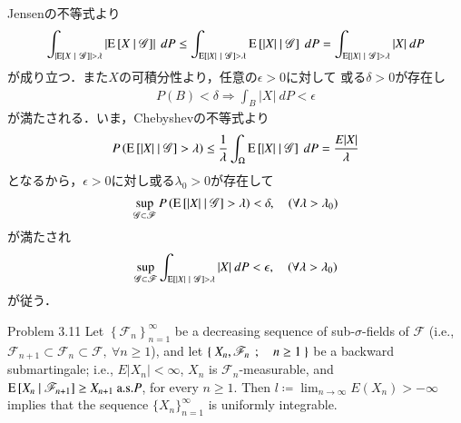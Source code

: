 	\begin{prf}
		Jensenの不等式より
		\begin{align}
			\int_{\left| \operatorname{E} \left[ X \ \middle|\ \mathscr{G} \right] \right| > \lambda} \left| \operatorname{E} \left[ X \ \middle|\ \mathscr{G} \right] \right|\ dP
			\leq \int_{\operatorname{E} \left[ |X| \ \middle|\ \mathscr{G} \right] > \lambda} \operatorname{E} \left[ |X| \ \middle|\ \mathscr{G} \right]\ dP
			= \int_{\operatorname{E} \left[ |X| \ \middle|\ \mathscr{G} \right] > \lambda} |X|\ dP
		\end{align}
		が成り立つ．また$X$の可積分性より，任意の$\epsilon > 0$に対して
		或る$\delta > 0$が存在し
		\begin{align}
			P(B) < \delta \Rightarrow \int_B |X|\ dP < \epsilon
		\end{align}
		が満たされる．いま，Chebyshevの不等式より
		\begin{align}
			P\left( \cexp{|X|}{\mathscr{G}} > \lambda \right)
			\leq \frac{1}{\lambda} \int_\Omega \cexp{|X|}{\mathscr{G}}\ dP
			= \frac{E|X|}{\lambda}
		\end{align}
		となるから，$\epsilon > 0$に対し或る$\lambda_0 > 0$が存在して
		\begin{align}
			\operatorname*{sup}_{\mathscr{G} \subset \mathscr{F}} P\left( \operatorname{E} \left[ |X| \ \middle|\ \mathscr{G} \right] > \lambda \right)
			< \delta,
			\quad (\forall \lambda > \lambda_0)
		\end{align}
		が満たされ
		\begin{align}
			\operatorname*{sup}_{\mathscr{G} \subset \mathscr{F}} \int_{\operatorname{E} \left[ |X| \ \middle|\ \mathscr{G} \right] > \lambda}|X|\ dP
			< \epsilon,
			\quad (\forall \lambda > \lambda_0)
		\end{align}
		が従う．
		\QED
	\end{prf}
	
	\begin{itembox}[l]{Problem 3.11}
		Let $\left\{ \mathscr{F}_n \right\}_{n=1}^\infty$ be a decreasing sequence of sub-$\sigma$-fields of 
		$\mathscr{F}$ (i.e.,$\mathscr{F}_{n+1} \subset \mathscr{F}_n \subset \mathscr{F},\ \forall n \geq 1$),
		and let $\left\{\ X_n,\mathscr{F}_n\ \, ; \quad n \geq 1\ \right\}$ be a backward submartingale; i.e., $E|X_n| < \infty$, $X_n$
		is $\mathscr{F}_n$-measurable, and $\operatorname{E} \left[ X_n \ \middle|\ \mathscr{F}_{n+1} \right] \geq X_{n+1}\ \mbox{a.s.$P$}$, for
		every $n \geq 1$. Then $l \coloneqq \lim_{n \to \infty} E(X_n) > -\infty$ implies that the sequence $\{X_n\}_{n=1}^\infty$
		is uniformly integrable.
	\end{itembox}
	
